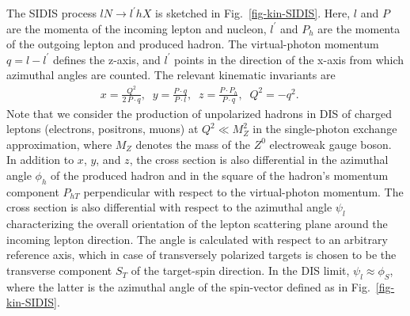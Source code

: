 \documentclass[a4paper,11pt]{article}
\newcommand{\ba}{\begin{eqnarray}}
\newcommand{\ea}{\end{eqnarray}}
\def\Phperp{P_{hT}}
\begin{document}
The SIDIS process  $lN\to l^\prime h X$ is sketched in
Fig.~\ref{fig-kin-SIDIS}. Here, $l$ and $P$ are the momenta of the incoming
lepton and nucleon, $l^\prime$ and $P_h$ are the momenta of the outgoing
lepton and produced hadron. The virtual-photon momentum $q=l-l^\prime$
defines the z-axis, and $l^\prime$ points in the direction of the x-axis
from which azimuthal angles are counted. The relevant kinematic invariants
are
\ba
   x  = \frac{Q^2}{2\,P\cdot  q}, \;\;
   y = \frac{P \cdot  q}{P \cdot  l}, \;\;
   z = \frac{P \cdot  P_h}{P\cdot  q}, \;\;
   Q^2=-q^2.
\label{eq:xyz}\;\;\;\;\ea
Note that we consider the production of unpolarized hadrons in DIS of
charged leptons (electrons, positrons, muons) at $Q^2 \ll M_Z^2$
in the single-photon exchange approximation,
where $M_Z$ denotes the mass of the $Z^0$ electroweak gauge boson.
In addition to $x$, $y$, and $z$, the cross section is also differential
in the azimuthal angle $\phi_h$ of the produced hadron and in the square
of the hadron's momentum component $\Phperp$ perpendicular with respect to the
virtual-photon momentum.  The cross section is also
differential with respect to the azimuthal angle $\psi_l$
 characterizing the overall orientation of the lepton scattering plane
around the incoming lepton direction. The angle is calculated with respect
to an arbitrary reference axis, which in case of transversely polarized
targets is chosen to be the transverse component $S_T$ of the target-spin direction.
In the DIS limit, $\psi_l \approx \phi_S$, where the latter is the azimuthal angle of
the spin-vector defined as in Fig.~\ref{fig-kin-SIDIS}.
\end{document}
